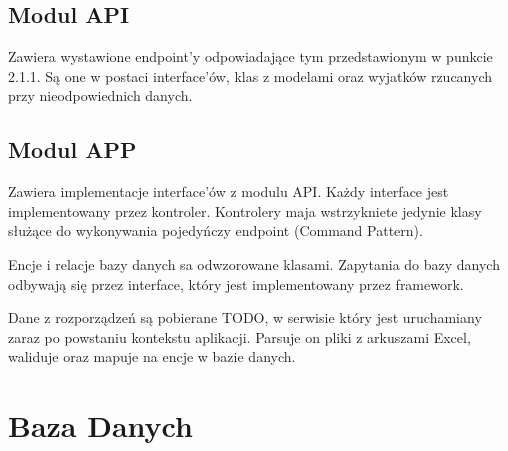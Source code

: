 \documentclass{article}
\begin{document}
  \subsection{Modul API}
  Zawiera wystawione endpoint'y odpowiadające tym przedstawionym w punkcie 2.1.1.
  Są one w postaci interface'ów, klas z modelami oraz wyjatków rzucanych przy nieodpowiednich danych.

  \subsection{Modul APP}
  Zawiera implementacje interface'ów z modulu API.
  Każdy interface jest implementowany przez kontroler.
  Kontrolery maja wstrzykniete jedynie klasy służące do wykonywania pojedyńczy endpoint (Command Pattern).

  Encje i relacje bazy danych sa odwzorowane klasami.
  Zapytania do bazy danych odbywają się przez interface, który jest implementowany przez framework.

  Dane z rozporządzeń są pobierane TODO, w serwisie który jest uruchamiany zaraz po powstaniu kontekstu aplikacji.
  Parsuje on pliki z arkuszami Excel, waliduje oraz mapuje na encje w bazie danych.
  \section{Baza Danych}
\end{document}

